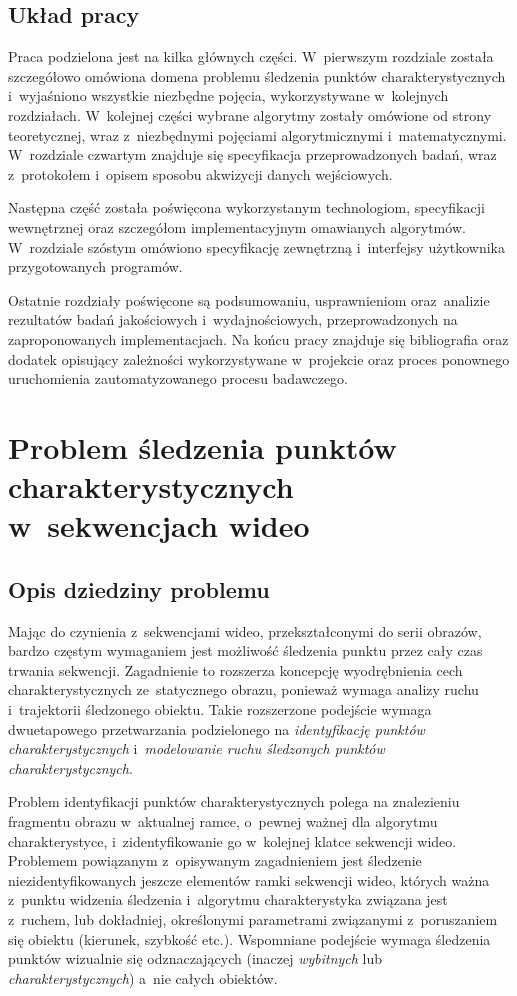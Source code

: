   \section{Układ pracy}\label{Section_Layout}
    Praca podzielona jest na kilka głównych części. W~pierwszym rozdziale została szczegółowo omówiona domena problemu śledzenia punktów charakterystycznych i~wyjaśniono wszystkie niezbędne pojęcia, wykorzystywane w~kolejnych rozdziałach. W~kolejnej części wybrane algorytmy zostały omówione od strony teoretycznej, wraz z~niezbędnymi pojęciami algorytmicznymi i~matematycznymi. W~rozdziale czwartym znajduje się specyfikacja przeprowadzonych badań, wraz z~protokołem i~opisem sposobu akwizycji danych wejściowych.

    Następna część została poświęcona wykorzystanym technologiom, specyfikacji wewnętrznej oraz szczegółom implementacyjnym omawianych algorytmów. W~rozdziale szóstym omówiono specyfikację zewnętrzną i~interfejsy użytkownika przygotowanych programów.

    Ostatnie rozdziały poświęcone są podsumowaniu, usprawnieniom oraz~analizie rezultatów badań jakościowych i~wydajnościowych, przeprowadzonych na zaproponowanych implementacjach. Na końcu pracy znajduje się bibliografia oraz dodatek opisujący zależności wykorzystywane w~projekcie oraz proces ponownego uruchomienia zautomatyzowanego procesu badawczego.

\chapter{Problem śledzenia punktów charakterystycznych w~sekwencjach wideo}

  \section{Opis dziedziny problemu}\label{Section_Problematyka}
    Mając do czynienia z~sekwencjami wideo, przekształconymi do serii obrazów, bardzo częstym wymaganiem jest możliwość śledzenia punktu przez cały czas trwania sekwencji. Zagadnienie to rozszerza koncepcję wyodrębnienia cech charakterystycznych ze~statycznego obrazu, ponieważ wymaga analizy ruchu i~trajektorii śledzonego obiektu. Takie rozszerzone podejście wymaga dwuetapowego przetwarzania podzielonego na \textit{identyfikację punktów charakterystycznych} i~\textit{modelowanie ruchu śledzonych punktów charakterystycznych}.

    Problem identyfikacji punktów charakterystycznych polega na znalezieniu fragmentu obrazu w~aktualnej ramce, o~pewnej ważnej dla algorytmu charakterystyce, i~zidentyfikowanie go w~kolejnej klatce sekwencji wideo. Problemem powiązanym z~opisywanym zagadnieniem jest śledzenie niezidentyfikowanych jeszcze elementów ramki sekwencji wideo, których ważna z~punktu widzenia śledzenia i~algorytmu charakterystyka związana jest z~ruchem, lub dokładniej, określonymi parametrami związanymi z~poruszaniem się obiektu (kierunek, szybkość etc.). Wspomniane podejście wymaga śledzenia punktów wizualnie się odznaczających (inaczej \textit{wybitnych} lub \textit{charakterystycznych}) a~nie całych obiektów.


